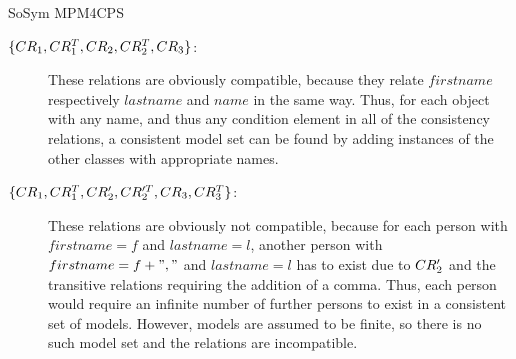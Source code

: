 \begin{copiedFrom}{SoSym MPM4CPS}
\begin{example}
\begin{description}
\item[$\{ CR_{1}, CR^T_{1},CR_{2}, CR^T_{2}, CR_{3} \}$:]
These relations are obviously compatible, because they relate $firstname$ respectively $lastname$ and $name$ in the same way. Thus, for each object with any name, and thus any condition element in all of the consistency relations, a consistent model set can be found by adding instances of the other classes with appropriate names.

\item[$\{ CR_{1}, CR^T_{1},CR'_{2}, CR'^T_{2}, CR_{3}, CR^T_{3} \}$:]
These relations are obviously not compatible, because for each person with $firstname = f$ and $lastname = l$, another person with $firstname = f + ","$ and $lastname = l$ has to exist due to $CR'_{2}$ and the transitive relations requiring the addition of a comma. Thus, each person would require an infinite number of further persons to exist in a consistent set of models. However, models are assumed to be finite, so there is no such model set and the relations are incompatible.


\end{description}
\end{example}
\end{copiedFrom}
